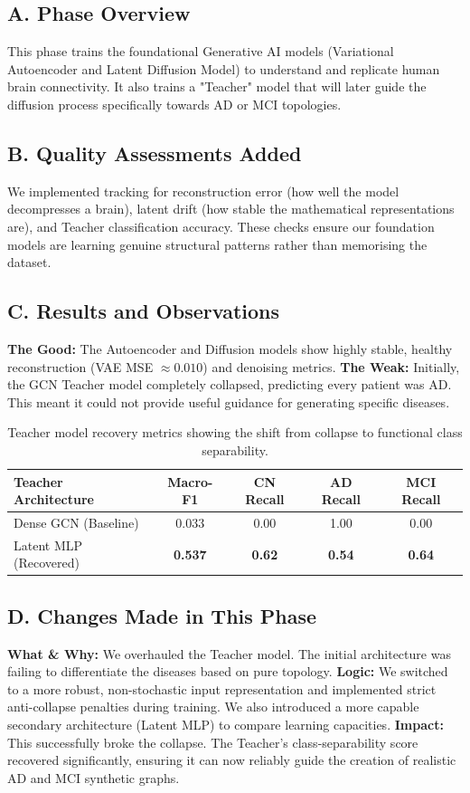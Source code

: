 \documentclass[11pt, a4paper]{article}
\begin{document}
\subsection{A. Phase Overview}
This phase trains the foundational Generative AI models (Variational Autoencoder and Latent Diffusion Model) to understand and replicate human brain connectivity. It also trains a "Teacher" model that will later guide the diffusion process specifically towards AD or MCI topologies.

\subsection{B. Quality Assessments Added}
We implemented tracking for reconstruction error (how well the model decompresses a brain), latent drift (how stable the mathematical representations are), and Teacher classification accuracy. These checks ensure our foundation models are learning genuine structural patterns rather than memorising the dataset.

\subsection{C. Results and Observations}
\textbf{The Good:} The Autoencoder and Diffusion models show highly stable, healthy reconstruction (VAE MSE $\approx 0.010$) and denoising metrics.
\textbf{The Weak:} Initially, the GCN Teacher model completely collapsed, predicting every patient was AD. This meant it could not provide useful guidance for generating specific diseases.

\begin{table}[H]
\centering
\begin{tabular}{@{}lcccc@{}}
\toprule
\textbf{Teacher Architecture} & \textbf{Macro-F1} & \textbf{CN Recall} & \textbf{AD Recall} & \textbf{MCI Recall} \\
\midrule
Dense GCN (Baseline) & 0.033 & 0.00 & 1.00 & 0.00 \\
Latent MLP (Recovered) & \textbf{0.537} & \textbf{0.62} & \textbf{0.54} & \textbf{0.64} \\
\bottomrule
\end{tabular}
\caption{Teacher model recovery metrics showing the shift from collapse to functional class separability.}
\end{table}

\subsection{D. Changes Made in This Phase}
\textbf{What \& Why:} We overhauled the Teacher model. The initial architecture was failing to differentiate the diseases based on pure topology.
\textbf{Logic:} We switched to a more robust, non-stochastic input representation and implemented strict anti-collapse penalties during training. We also introduced a more capable secondary architecture (Latent MLP) to compare learning capacities.
\textbf{Impact:} This successfully broke the collapse. The Teacher's class-separability score recovered significantly, ensuring it can now reliably guide the creation of realistic AD and MCI synthetic graphs.
\end{document}
